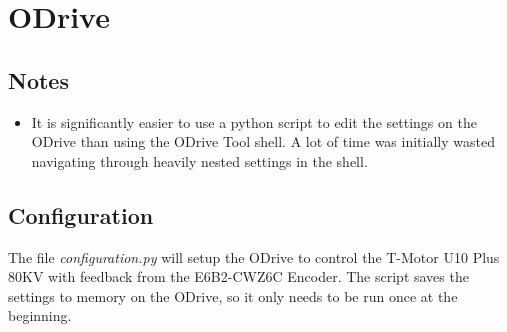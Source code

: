\documentclass[11pt, titlepage]{article}
\begin{document}
\newpage
\section{ODrive}
\subsection{Notes}
\begin{itemize}
	\item It is significantly easier to use a python script to edit the settings on the ODrive than using the ODrive Tool shell. A lot of time was initially wasted navigating through heavily nested settings in the shell.
\end{itemize}

\subsection{Configuration}
The file \textit{configuration.py} will setup the ODrive to control the T-Motor U10 Plus 80KV with feedback from the E6B2-CWZ6C Encoder. The script saves the settings to memory on the ODrive, so it only needs to be run once at the beginning.
\end{document}
